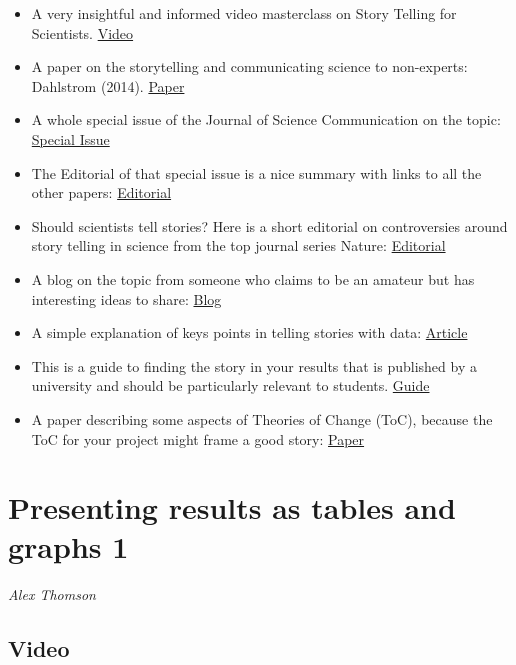 \documentclass[
  titlepage]{book}
\begin{document}
\begin{itemize}
\item
  A very insightful and informed video masterclass on Story Telling for Scientists. \href{https://www.youtube.com/watch?v=6aVgf3T6p_8}{Video}
\item
  A paper on the storytelling and communicating science to non-experts: Dahlstrom (2014). \href{https://doi.org/10.1073/pnas.1320645111}{Paper}
\item
  A whole special issue of the Journal of Science Communication on the topic: \href{https://jcom.sissa.it/archive/18/05.}{Special Issue}
\item
  The Editorial of that special issue is a nice summary with links to all the other papers: \href{https://doi.org/10.22323/2.18050501}{Editorial}
\item
  Should scientists tell stories? Here is a short editorial on controversies around story telling in science from the top journal series Nature: \href{https://doi.org/10.1038/nmeth.2726}{Editorial}
\item
  A blog on the topic from someone who claims to be an amateur but has interesting ideas to share: \href{https://sokolj.com/Communicating-Data-Stories/}{Blog}
\item
  A simple explanation of keys points in telling stories with data: \href{https://www.dataversity.net/telling-stories-data-five-strategies-presenting-effective-data/\#}{Article}
\item
  This is a guide to finding the story in your results that is published by a university and should be particularly relevant to students. \href{https://www.monash.edu/rlo/graduate-research-writing/write-the-thesis/writing-the-thesis-chapters/reporting-and-discussing-your-findings\#present-your-findings}{Guide}
\item
  A paper describing some aspects of Theories of Change (ToC), because the ToC for your project might frame a good story: \href{https://evaluationcanada.ca/system/files/cjpe-entries/30-2-119_0.pdf}{Paper}
\end{itemize}

\hypertarget{tablegraph1}{%
\chapter{Presenting results as tables and graphs 1}\label{tablegraph1}}

\emph{Alex Thomson}

\hypertarget{video-1}{%
\section{Video}\label{video-1}}
\end{document}
